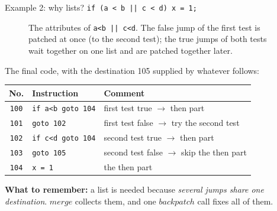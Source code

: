 \documentclass[11pt,a4paper]{article}
\begin{document}
\begin{examplebox}{Example 2: why lists? \texttt{if (a < b || c < d) x = 1;}}
\begin{figure}[H]
{}
\caption{The attributes of \texttt{a<b || c<d}. The false jump of the first test is patched at once (to the second test); the true jumps of both tests wait together on one list and are patched together later.}
\end{figure}
The final code, with the destination 105 supplied by whatever follows:
\begin{center}
\small
\begin{tabular}{@{}c l l@{}}
\toprule
\textbf{No.} & \textbf{Instruction} & \textbf{Comment} \\ \midrule
\texttt{100} & \texttt{if a<b goto 104} & first test true $\to$ then part \\
\texttt{101} & \texttt{goto 102} & first test false $\to$ try the second test \\
\texttt{102} & \texttt{if c<d goto 104} & second test true $\to$ then part \\
\texttt{103} & \texttt{goto 105} & second test false $\to$ skip the then part \\
\texttt{104} & \texttt{x = 1} & the then part \\ \bottomrule
\end{tabular}
\end{center}
\textbf{What to remember:} a list is needed because \emph{several jumps share one destination}. $\mathit{merge}$ collects them, and one $\mathit{backpatch}$ call fixes all of them.
\end{examplebox}
\end{document}
